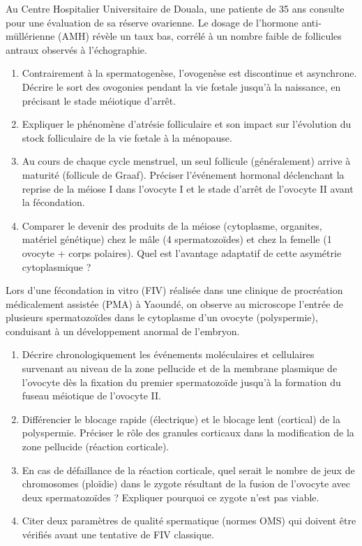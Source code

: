 \documentclass[11pt]{article}
\begin{document}
\begin{exercice}
Au Centre Hospitalier Universitaire de Douala, une patiente de 35 ans consulte pour une évaluation de sa réserve ovarienne. Le dosage de l'hormone anti-müllérienne (AMH) révèle un taux bas, corrélé à un nombre faible de follicules antraux observés à l'échographie.
\begin{enumerate}
    \item Contrairement à la spermatogenèse, l'ovogenèse est discontinue et asynchrone. Décrire le sort des ovogonies pendant la vie fœtale jusqu'à la naissance, en précisant le stade méiotique d'arrêt.
    \item Expliquer le phénomène d'atrésie folliculaire et son impact sur l'évolution du stock folliculaire de la vie fœtale à la ménopause.
    \item Au cours de chaque cycle menstruel, un seul follicule (généralement) arrive à maturité (follicule de Graaf). Préciser l'événement hormonal déclenchant la reprise de la méiose I dans l'ovocyte I et le stade d'arrêt de l'ovocyte II avant la fécondation.
    \item Comparer le devenir des produits de la méiose (cytoplasme, organites, matériel génétique) chez le mâle (4 spermatozoïdes) et chez la femelle (1 ovocyte + corps polaires). Quel est l'avantage adaptatif de cette asymétrie cytoplasmique ?
\end{enumerate}
\end{exercice}

\begin{exercice}
Lors d'une fécondation in vitro (FIV) réalisée dans une clinique de procréation médicalement assistée (PMA) à Yaoundé, on observe au microscope l'entrée de plusieurs spermatozoïdes dans le cytoplasme d'un ovocyte (polyspermie), conduisant à un développement anormal de l'embryon.
\begin{enumerate}
    \item Décrire chronologiquement les événements moléculaires et cellulaires survenant au niveau de la zone pellucide et de la membrane plasmique de l'ovocyte dès la fixation du premier spermatozoïde jusqu'à la formation du fuseau méiotique de l'ovocyte II.
    \item Différencier le blocage rapide (électrique) et le blocage lent (cortical) de la polyspermie. Préciser le rôle des granules corticaux dans la modification de la zone pellucide (réaction corticale).
    \item En cas de défaillance de la réaction corticale, quel serait le nombre de jeux de chromosomes (ploïdie) dans le zygote résultant de la fusion de l'ovocyte avec deux spermatozoïdes ? Expliquer pourquoi ce zygote n'est pas viable.
    \item Citer deux paramètres de qualité spermatique (normes OMS) qui doivent être vérifiés avant une tentative de FIV classique.
\end{enumerate}
\end{exercice}
\end{document}
